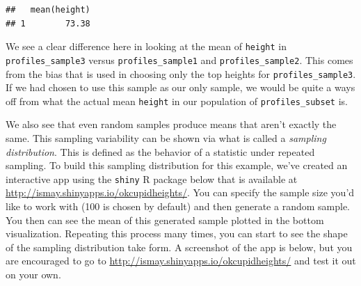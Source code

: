 \documentclass[]{tufte-book}
\newenvironment{Shaded}{\begin{snugshade}}{\end{snugshade}}
\newcommand{\KeywordTok}[1]{\textcolor[rgb]{0.13,0.29,0.53}{\textbf{{#1}}}}
\newcommand{\StringTok}[1]{\textcolor[rgb]{0.31,0.60,0.02}{{#1}}}
\newcommand{\NormalTok}[1]{{#1}}
\begin{document}
\begin{Shaded}
\end{Shaded}

\begin{verbatim}
##   mean(height)
## 1        73.38
\end{verbatim}

We see a clear difference here in looking at the mean of \texttt{height}
in \texttt{profiles\_sample3} versus \texttt{profiles\_sample1} and
\texttt{profiles\_sample2}. This comes from the bias that is used in
choosing only the top heights for \texttt{profiles\_sample3}. If we had
chosen to use this sample as our only sample, we would be quite a ways
off from what the actual mean \texttt{height} in our population of
\texttt{profiles\_subset} is.

We also see that even random samples produce means that aren't exactly
the same. This sampling variability can be shown via what is called a
\emph{sampling distribution}. This is defined as the behavior of a
statistic under repeated sampling. To build this sampling distribution
for this example, we've created an interactive app using the
\texttt{shiny} R package below that is available at
\url{http://ismay.shinyapps.io/okcupidheights/}. You can specify the
sample size you'd like to work with (100 is chosen by default) and then
generate a random sample. You then can see the mean of this generated
sample plotted in the bottom visualization. Repeating this process many
times, you can start to see the shape of the sampling distribution take
form. A screenshot of the app is below, but you are encouraged to go to
\url{http://ismay.shinyapps.io/okcupidheights/} and test it out on your
own.
\end{document}
